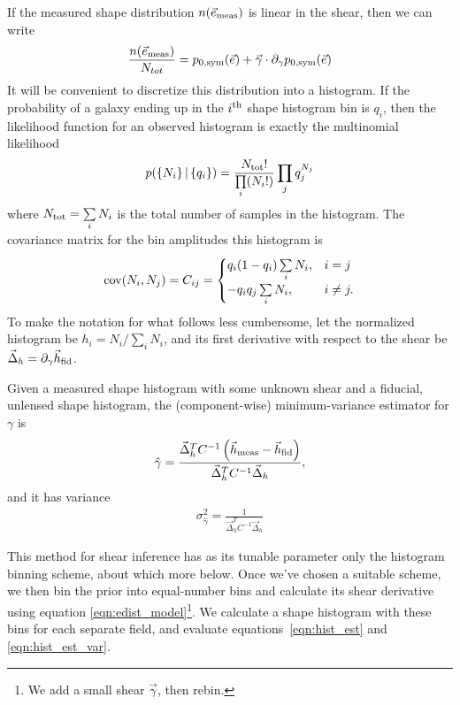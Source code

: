 \documentclass[iop]{emulateapj}
\begin{document}
If the measured shape distribution $n(\vec{e}_{\rm meas})$ is linear in the shear, then we can write
\begin{align}
\frac{n(\vec{e}_{\rm meas})}{N_{tot}} = p_{0,\rm sym}(\vec{e}) + \vec{\gamma}\cdot \partial_{\gamma} p_{0,\rm sym}(\vec{e})
\end{align}
It will be convenient to discretize this distribution into a histogram. If the probability of a galaxy ending up in the $i^{\rm th}$ shape histogram bin is $q_i$, then the likelihood function for an observed histogram is exactly the multinomial likelihood
\begin{align}
p( \left\{N_i\right\} |\left\{ q_i\right\} ) = \frac{N_{\rm tot}!}{\prod\limits_i (N_i!)}\prod\limits_j q_j^{N_j}
\label{eqn:multnomial}
\end{align}
where $N_{\rm tot} = \sum\limits_i N_i$ is the total number of samples in the histogram.
The covariance matrix for the bin amplitudes this histogram is
\begin{align}
{\rm cov}(N_i, N_j) = C_{ij} = \begin{cases}
  q_i(1-q_i)\sum\limits_i N_i, & i=j \\
  -q_iq_j \sum\limits_i N_i, & i \neq j.
\end{cases}
\end{align}
To make the notation for what follows less cumbersome, let the normalized histogram be $h_i = N_i / \sum\limits_i N_i$, and its first derivative with respect to the shear be $\vec{\Delta}_h=\partial_{\gamma}\vec{h}_{\rm fid}$.

Given a measured shape histogram with some unknown shear and a fiducial, unlensed shape histogram, the (component-wise) minimum-variance estimator for $\gamma$ is
\begin{align}
\hat{\gamma} = \frac{\vec{\Delta}_h^T C^{-1}\left( \vec{h}_{\rm meas} - \vec{h}_{\rm fid}\right)} {\vec{\Delta}_h^TC^{-1}\vec{\Delta}_h},
\label{eqn:hist_est}
\end{align}
and it has variance
\begin{align}
\sigma^2_{\hat{\gamma}} = \frac{1}{\vec{\Delta}_h^TC^{-1}\vec{\Delta}_h}
\label{eqn:hist_est_var}
\end{align}

This method for shear inference has as its tunable parameter only the histogram binning scheme, about which more below. Once we've chosen a suitable scheme, we then bin the prior into equal-number bins and calculate its shear derivative using equation \ref{eqn:edist_model}\footnote{We add a small shear $\vec{\gamma}$, then rebin.}. We calculate a shape histogram with these bins for each separate field, and evaluate equations~\ref{eqn:hist_est} and \ref{eqn:hist_est_var}.
\end{document}
